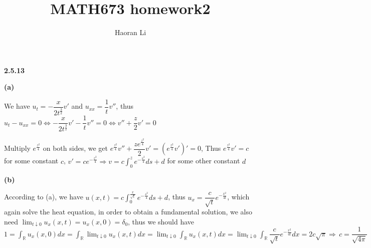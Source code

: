 \documentclass[12pt]{article}
\title{MATH673 homework2}
\author{Haoran Li}
\date{}
\begin{document}
\maketitle
\textbf{2.5.13} \par
\textbf{(a)} \par
We have $u_{t}=-\dfrac{x}{2t^{\frac{3}{2}}}v'$ and $u_{xx}=\dfrac{1}{t}v''$, thus $u_{t}-u_{xx}=0 \Leftrightarrow -\dfrac{x}{2t^{\frac{3}{2}}}v'-\dfrac{1}{t}v''=0 \Leftrightarrow v''+\dfrac{z}{2}v'=0$ \par
Multiply $e^{\frac{z^{2}}{4}}$ on both sides, we get $e^{\frac{z^{2}}{4}}v''+\dfrac{ze^{\frac{z^{2}}{4}}}{2}v'=\left(e^{\frac{z^{2}}{4}}v'\right)'=0$, Thus $e^{\frac{z^{2}}{4}}v'=c$ for some constant $c$, $v'=ce^{-\frac{z^{2}}{4}} \Rightarrow \displaystyle v=c\int_{0}^{z}e^{-\frac{s^{2}}{4}}ds+d$ for some other constant $d$ \par
\textbf{(b)} \par
According to (a), we have $u(x,t)=\displaystyle c\int_{0}^{\frac{x}{\sqrt{t}}}e^{-\frac{s^{2}}{4}}ds+d$, thus $u_{x}=\dfrac{c}{\sqrt{t}}e^{-\frac{x^{2}}{4t}}$, which again solve the heat equation, in order to obtain a fundamental solution, we also need $\lim_{t\downarrow 0}u_x(x,t)=u_x(x,0)=\delta_0$, thus we should have $1=\displaystyle \int_\mathbb{R}u_x(x,0)dx=\int_\mathbb{R}\lim_{t\downarrow 0}u_x(x,t)dx=\lim_{t\downarrow 0}\int_\mathbb{R}u_x(x,t)dx=\lim_{t\downarrow 0}\int_\mathbb{R}\dfrac{c}{\sqrt{t}}e^{-\frac{x^{2}}{4t}}dx=2c\sqrt{\pi}\Rightarrow \, c=\dfrac{1}{\sqrt{4\pi}}$ \par
\end{document}
